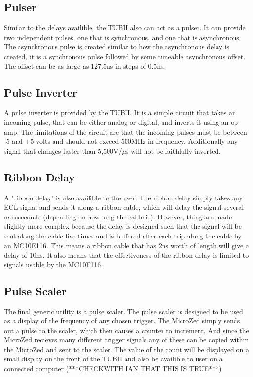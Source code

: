 \documentclass[11pt,a4paper]{article}
\begin{document}
\subsection{Pulser}
Similar to the delays availible, the TUBII also can act as a pulser. It can provide two independent pulses, one that is synchronous, and one that is asynchronous. The asynchronous pulse is created similar to how the asynchronous delay is created, it is a synchronous pulse followed by some tuneable asynchronous offset. The offset can be as large as 127.5ns in steps of 0.5ns.
\subsection{Pulse Inverter}
A pulse inverter is provided by the TUBII. It is a simple circuit that takes an incoming pulse, that can be either analog or digital, and inverts it using an op-amp. The limitations of the circuit are that the incoming pulses must be between -5 and +5 volts and should not exceed 500MHz in frequency. Additionally any signal that changes faster than 5,500V/$\mu$s will not be faithfully inverted.
\subsection{Ribbon Delay}
A "ribbon delay" is also availible to the user. The ribbon delay simply takes any ECL signal and sends it along a ribbon cable, which will delay the signal several nanoseconds (depending on how long the cable is). However, thing are made slightly more complex because the delay is designed such that the signal will be sent along the cable five times and is buffered after each trip along the cable by an MC10E116. This means a ribbon cable that has 2ns worth of length will give a delay of 10ns. It also means that the effectiveness of the ribbon delay is limited to signals usable by the MC10E116.

\subsection{Pulse Scaler}
The final generic utility is a pulse scaler. The pulse scaler is designed to be used as a display of the frequency of any chosen trigger. The MicroZed simply sends out a pulse to the scaler, which then causes a counter to increment. And since the MicroZed recieves many different trigger signals any of these can be copied within the MicroZed and sent to the scaler. The value of the count will be displayed on a small display on the front of the TUBII and also be availible to user on a connected computer (***CHECKWITH IAN THAT THIS IS TRUE***)
\end{document}
